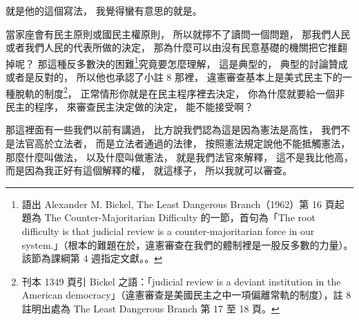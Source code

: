 \hypertarget{w06:cue:213}{}就是他的這個寫法，
\hypertarget{w06:cue:214}{}我覺得蠻有意思的就是。

\hypertarget{w06:cue:215}{}當家座會有民主原則或國民主權原則，
\hypertarget{w06:cue:216}{}所以就擰不了讀問一個問題，
\hypertarget{w06:cue:217}{}那我們人民或者我們人民的代表所做的決定，
\hypertarget{w06:cue:218}{}那為什麼可以由沒有民意基礎的機關把它推翻掉呢？
\hypertarget{w06:cue:219}{}那這種反多數決的困難\footnote{語出 Alexander M. Bickel, The Least Dangerous Branch（1962）第 16 頁起題為 The Counter-Majoritarian Difficulty 的一節，首句為「The root difficulty is that judicial review is a counter-majoritarian force in our system.」（根本的難題在於，違憲審查在我們的體制裡是一股反多數的力量）。該節為課綱第 4 週指定文獻。\cite{bickel1962}。}究竟要怎麼理解，
\hypertarget{w06:cue:220}{}這是典型的，
\hypertarget{w06:cue:221}{}典型的討論贊成或者是反對的，
\hypertarget{w06:cue:222}{}所以他也承認了小註 8 那裡，
\hypertarget{w06:cue:223}{}違憲審查基本上是美式民主下的一種脫軌的制度\footnote{刊本 1349 頁引 Bickel 之語：「judicial review is a deviant institution in the American democracy」（違憲審查是美國民主之中一項偏離常軌的制度），註 8 註明出處為 The Least Dangerous Branch 第 17 至 18 頁。}，
\hypertarget{w06:cue:224}{}正常情形你就是在民主程序裡去決定，
\hypertarget{w06:cue:225}{}你為什麼就要給一個非民主的程序，
\hypertarget{w06:cue:226}{}來審查民主決定做的決定，
\hypertarget{w06:cue:227}{}能不能接受啊？

\hypertarget{w06:cue:228}{}那這裡面有一些我們以前有講過，
\hypertarget{w06:cue:229}{}比方說我們認為這是因為憲法是高性，
\hypertarget{w06:cue:230}{}我們不是法官高於立法者，
\hypertarget{w06:cue:231}{}而是立法者通過的法律，
\hypertarget{w06:cue:232}{}按照憲法規定說他不能抵觸憲法，
\hypertarget{w06:cue:233}{}那麼什麼叫做法，
\hypertarget{w06:cue:234}{}以及什麼叫做憲法，
\hypertarget{w06:cue:235}{}就是我們法官來解釋，
\hypertarget{w06:cue:236}{}這不是我比他高，
\hypertarget{w06:cue:237}{}而是因為我正好有這個解釋的權，
\hypertarget{w06:cue:238}{}就這樣子，
\hypertarget{w06:cue:239}{}所以我就可以審查。

